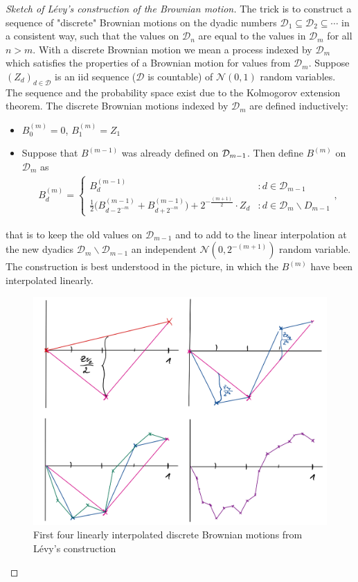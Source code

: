 \begin{proof}[Sketch of L\'evy's construction of the Brownian motion]
	The trick is to construct a sequence of "discrete"{} Brownian motions on the dyadic numbers $\mathcal D_1\subseteq \mathcal D_2\subseteq \cdots$ in a consistent way, such that the values on $\mathcal D_n$ are equal to the values in $\mathcal D_m$ for all $n>m$. With a discrete Brownian motion we mean a process indexed by $\mathcal D_m$ which satisfies the properties of a Brownian motion for values from $\mathcal D_m$. Suppose $(Z_d)_{d\in \mathcal D}$ is an iid sequence ($\mathcal D$ is countable) of $\mathcal N(0,1)$ random variables. The sequence and the probability space exist due to the Kolmogorov extension theorem. The discrete Brownian motions indexed by $\mathcal D_m$ are defined inductively: 
	\begin{itemize}
		\item $B^{(m)}_0 = 0$, $B^{(m)}_1 = Z_1$
		\item Suppose that $B^{(m-1)}$ was already defined on $\mathcal{D}_{m-1}$. Then define $B^{(m)}$ on $\mathcal D_m$ as
		\begin{align*}
			B^{(m)}_d =\begin{cases}
				B^{(m-1)}_d&: d\in \mathcal D_{m-1}\\
				 \frac{1}{2}\big(B^{(m-1)}_{d-2^{-m}} +B^{(m-1)}_{d+2^{-m}}\big) +  2^{-\frac{(m+1)}{2}}\cdot Z_d&: d\in \mathcal D_m\backslash D_{m-1}
			\end{cases},
		\end{align*}
	\end{itemize}
	that is to keep the old values on $\mathcal D_{m-1}$ and to add to the linear interpolation at the new dyadics $\mathcal D_{m}\backslash \mathcal D_{m-1}$ an independent $\mathcal N(0,2^{-(m+1)})$ random variable. The construction is best understood in the picture, in which the $B^{(m)}$ have been interpolated linearly.
	\begin{figure}[h]
		\begin{center}
			\includegraphics[scale=0.2]{BML2.jpeg}
		\end{center}
		\caption*{First four linearly interpolated discrete Brownian motions from L\'evy's construction}
	\end{figure}


\end{proof}

